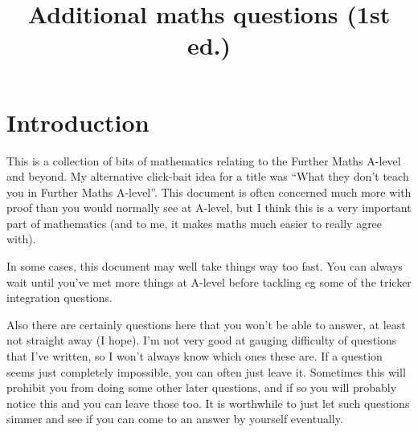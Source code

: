 \documentclass[fleqn,a4paper,11pt]{article}
\date{}
\author{}
\title{Additional maths questions (1st ed.)}
\begin{document}
\maketitle
\tableofcontents

\section{Introduction}

This is a collection of bits of mathematics relating to the Further Maths
A-level and beyond. My alternative click-bait idea for a title was ``What they
don't teach you in Further Maths A-level''. This document is often concerned
much more with proof than you would normally see at A-level, but I think this is
a very important part of mathematics (and to me, it makes maths much easier to
really agree with).

In some cases, this document may well take things way too fast. You can always
wait until you've met more things at A-level before tackling eg some of the
tricker integration questions.

Also there are certainly questions here that you won't be able to answer, at
least not straight away (I hope). I'm not very good at gauging difficulty of
questions that I've written, so I won't always know which ones these are. If a
question seems just completely impossible, you can often just leave it.
Sometimes this will prohibit you from doing some other later questions, and if
so you will probably notice this and you can leave those too. It is worthwhile
to just let such questions simmer and see if you can come to an answer by
yourself eventually.









\end{document}
